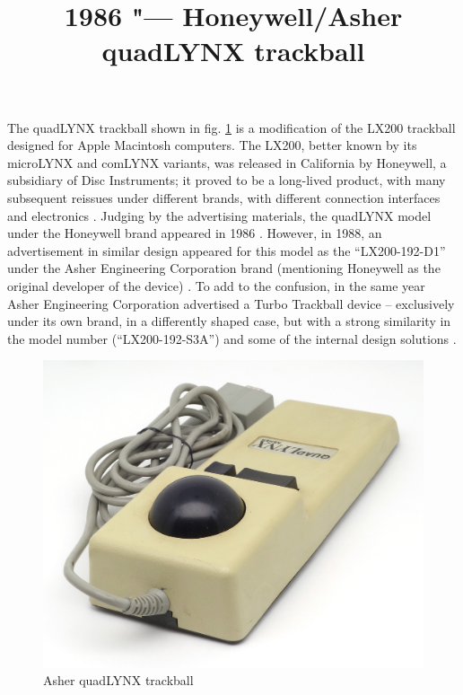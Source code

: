 \documentclass[11pt, a4paper]{article}
\begin{document}
\title{1986 "--- Honeywell/Asher quadLYNX trackball}
\date{}
\maketitle
{}
The quadLYNX trackball shown in fig. \ref{fig:quadLYNXPic} is a modification of the LX200 trackball designed for Apple Macintosh computers. The LX200, better known by its microLYNX and comLYNX variants, was released in California by Honeywell, a subsidiary of Disc Instruments; it proved to be a long-lived product, with many subsequent reissues under different brands, with different connection interfaces and electronics \cite{lx200}. Judging by the advertising materials, the quadLYNX model under the Honeywell brand appeared in 1986 \cite{honeywell}. However, in 1988, an advertisement in similar design appeared for this model as the ``LX200-192-D1'' under the Asher Engineering Corporation brand (mentioning Honeywell as the original developer of the device) \cite{asher}. To add to the confusion, in the same year Asher Engineering Corporation advertised a Turbo Trackball device -- exclusively under its own brand, in a differently shaped case, but with a strong similarity in the model number (``LX200-192-S3A'') and some of the internal design solutions \cite{turbo}.

\begin{figure}[h]
    \centering
    \includegraphics[scale=0.78]{1986_honeywell_asher_quadlynx_trackball/pic_30.jpg}
    \caption{Asher quadLYNX trackball}
    \label{fig:quadLYNXPic}
\end{figure}
\end{document}
